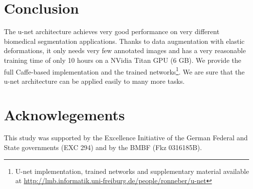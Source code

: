 \documentclass{llncs}
\begin{document}
\section{Conclusion}
The u-net architecture achieves very good performance on very different biomedical segmentation applications. Thanks to data augmentation with elastic deformations, it only needs very few annotated images and has a very reasonable training time of only 10 hours on a NVidia Titan GPU (6 GB).
We provide the full Caffe\cite{Caffe}-based implementation and the trained networks\footnote{U-net implementation, trained networks and supplementary material available at \href{http://lmb.informatik.uni-freiburg.de/people/ronneber/u-net}{http://lmb.informatik.uni-freiburg.de/people/ronneber/u-net}}. We are sure that the u-net architecture can be applied easily to many more tasks.

\section*{Acknowlegements}
This study was supported by the Excellence Initiative of
the German Federal and State governments (EXC 294) and by the BMBF (Fkz 0316185B).




\end{document}
